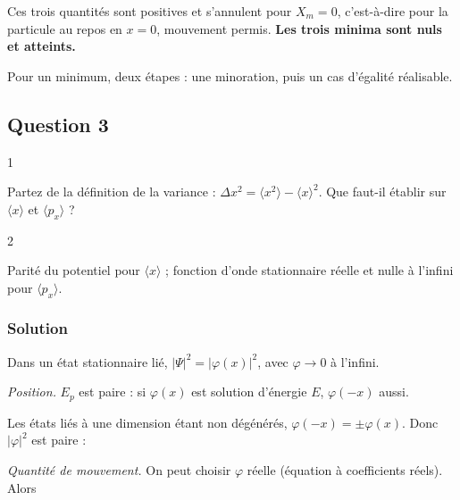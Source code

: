 \documentclass[11pt,a4paper]{article}
\newcommand{\equationajustee}[1]{%
  \sbox{\boiteequation}{$\displaystyle #1$}%
  \ifdim\wd\boiteequation>\linewidth
    \[\resizebox{\linewidth}{!}{\usebox{\boiteequation}}\]%
  \else
    \[#1\]%
  \fi}
\begin{document}
Ces trois quantités sont positives et s'annulent pour \(X_m=0\), c'est-à-dire pour la particule au repos en \(x=0\), mouvement permis. \textbf{Les trois minima sont nuls et atteints.}

\begin{methode}

Pour un minimum, deux étapes : une minoration, puis un cas d'égalité réalisable.

\end{methode}

\hypertarget{question-3}{%
\subsection{Question 3}\label{question-3}}

\begin{indication}{1}

Partez de la définition de la variance : \(\Delta x^2=\langle x^2\rangle-\langle x\rangle^2\). Que faut-il établir sur \(\langle x\rangle\) et \(\langle p_x\rangle\) ?

\end{indication}

\begin{indication}{2}

Parité du potentiel pour \(\langle x\rangle\) ; fonction d'onde stationnaire réelle et nulle à l'infini pour \(\langle p_x\rangle\).

\end{indication}

\hypertarget{solution-2}{%
\subsubsection{Solution}\label{solution-2}}

Dans un état stationnaire lié, \(\lvert\Psi\rvert^2=\lvert\varphi(x)\rvert^2\), avec \(\varphi\to0\) à l'infini.

\emph{Position.} \(E_p\) est paire : si \(\varphi(x)\) est solution d'énergie \(E\), \(\varphi(-x)\) aussi.

Les états liés à une dimension étant non dégénérés, \(\varphi(-x)=\pm\varphi(x)\). Donc \(\lvert\varphi\rvert^2\) est paire :

\equationajustee{\begin{aligned}
\langle x\rangle&=0\\
\Delta x^2&=\langle x^2\rangle
\end{aligned}}

\emph{Quantité de mouvement.} On peut choisir \(\varphi\) réelle (équation à coefficients réels). Alors
\end{document}
